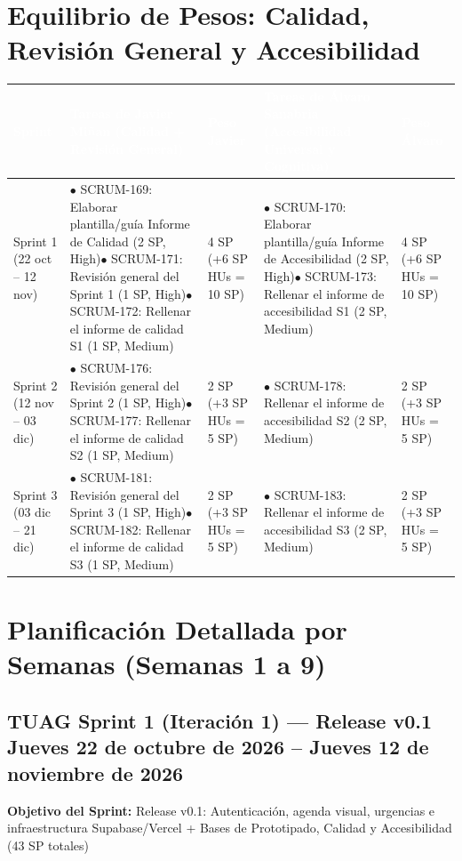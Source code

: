 \documentclass[11pt,a4paper]{article}
\newcommand{\cab}[1]{\textcolor{white}{\small\textbf{#1}}}
\begin{document}
\section{Equilibrio de Pesos: Calidad, Revisión General y Accesibilidad}
\begin{longtable}{|P{1.8cm}|P{4.5cm}|C{1.9cm}|P{4.5cm}|C{1.9cm}|}
\hline
{}\cab{Sprint} & \cab{Tareas de Javier Miñan (Calidad + Revisión General)} & \cab{Peso Javier} & \cab{Tareas de Álvaro Sanabria (Accesibilidad Universal y Cognitiva)} & \cab{Peso Álvaro} \\ \hline
\endhead
\small Sprint 1 (22 oct -- 12 nov) & \small $\bullet$ SCRUM-169: Elaborar plantilla/guía Informe de Calidad (2 SP, High)\newline $\bullet$ SCRUM-171: Revisión general del Sprint 1 (1 SP, High)\newline $\bullet$ SCRUM-172: Rellenar el informe de calidad S1 (1 SP, Medium) & 4 SP (+6 SP HUs = 10 SP) & \small $\bullet$ SCRUM-170: Elaborar plantilla/guía Informe de Accesibilidad (2 SP, High)\newline $\bullet$ SCRUM-173: Rellenar el informe de accesibilidad S1 (2 SP, Medium) & 4 SP (+6 SP HUs = 10 SP) \\ \hline
\small Sprint 2 (12 nov -- 03 dic) & \small $\bullet$ SCRUM-176: Revisión general del Sprint 2 (1 SP, High)\newline $\bullet$ SCRUM-177: Rellenar el informe de calidad S2 (1 SP, Medium) & 2 SP (+3 SP HUs = 5 SP) & \small $\bullet$ SCRUM-178: Rellenar el informe de accesibilidad S2 (2 SP, Medium) & 2 SP (+3 SP HUs = 5 SP) \\ \hline
\small Sprint 3 (03 dic -- 21 dic) & \small $\bullet$ SCRUM-181: Revisión general del Sprint 3 (1 SP, High)\newline $\bullet$ SCRUM-182: Rellenar el informe de calidad S3 (1 SP, Medium) & 2 SP (+3 SP HUs = 5 SP) & \small $\bullet$ SCRUM-183: Rellenar el informe de accesibilidad S3 (2 SP, Medium) & 2 SP (+3 SP HUs = 5 SP) \\ \hline
\end{longtable}

\section{Planificación Detallada por Semanas (Semanas 1 a 9)}
\subsection{TUAG Sprint 1 (Iteración 1) — Release v0.1 Jueves 22 de octubre de 2026 – Jueves 12 de noviembre de 2026}
\textbf{\color{gblue}Objetivo del Sprint:} Release v0.1: Autenticación, agenda visual, urgencias e infraestructura Supabase/Vercel + Bases de Prototipado, Calidad y Accesibilidad (43 SP totales)
\end{document}
